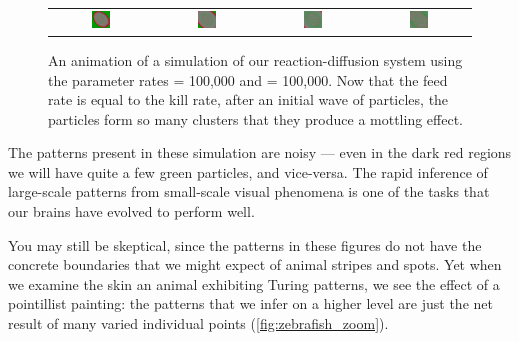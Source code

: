 \begin{figure}[h]
\begin{tabular}{c c c c}
\includegraphics[width = 0.19\textwidth]{../images/predator_prey_11_by_11_f_1_k_1_i4} & \includegraphics[width = 0.19\textwidth]{../images/../images/predator_prey_11_by_11_f_1_k_1_i5} & \includegraphics[width = 0.19\textwidth]{../images/../images/predator_prey_11_by_11_f_1_k_1_i6} & \includegraphics[width = 0.19\textwidth]{../images/../images/predator_prey_11_by_11_f_1_k_1_i7}
\end{tabular}
\caption{An animation of a simulation of our reaction-diffusion system using the parameter rates  = 100,000 and  = 100,000. Now that the feed rate is equal to the kill rate, after an initial wave of  particles, the  particles form so many clusters that they produce a mottling effect.}
\label{fig:k=100000_f=100000}
\end{figure}

\FloatBarrier

The patterns present in these simulation are noisy --- even in the dark red regions we will have quite a few green particles, and vice-versa. The rapid inference of large-scale patterns from small-scale visual phenomena is one of the tasks that our brains have evolved to perform well.

You may still be skeptical, since the patterns in these figures do not have the concrete boundaries that we might expect of animal stripes and spots. Yet when we examine the skin an animal exhibiting Turing patterns, we see the effect of a pointillist painting: the patterns that we infer on a higher level are just the net result of many varied individual points (\autoref{fig:zebrafish_zoom}).\\

